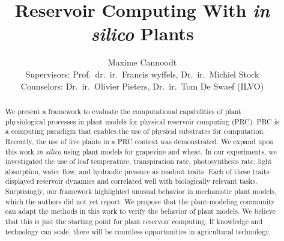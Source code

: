\documentclass[10pt,a4paper,journal]{IEEEtran}
\begin{document}
\title{Reservoir Computing With \textit{in silico} Plants}

\author{Maxime Cannoodt \\ \vspace{0.5cm}
        Supervisors: Prof.\ dr.\ ir.\ Francis wyffels, Dr.\ ir.\ Michiel Stock \\
        Counselors: Dr.\ ir.\ Olivier Pieters, Dr.\ ir.\ Tom De Swaef (ILVO)
        }%
        

\maketitle

\begin{abstract}
We present a framework to evaluate the computational capabilities of plant physiological processes in plant models for physical reservoir computing (PRC).
PRC is a computing paradigm that enables the use of physical substrates for computation. 
Recently, the use of live plants in a PRC context was demonstrated. 
We expand upon this work \textit{in silico} using plant models for grapevine and wheat. 
In our experiments, we investigated the use of leaf temperature, transpiration rate, photosynthesis rate, light absorption, water flow, and hydraulic pressure as readout traits. 
Each of these traits displayed reservoir dynamics and correlated well with biologically relevant tasks. 
Surprisingly, our framework highlighted unusual behavior in mechanistic plant models, which the authors did not yet report.
We propose that the plant-modeling community can adapt the methods in this work to verify the behavior of plant models. 
We believe that this is just the starting point for plant reservoir computing.
If knowledge and technology can scale, there will be countless opportunities in agricultural technology.
\end{abstract}
\end{document}
